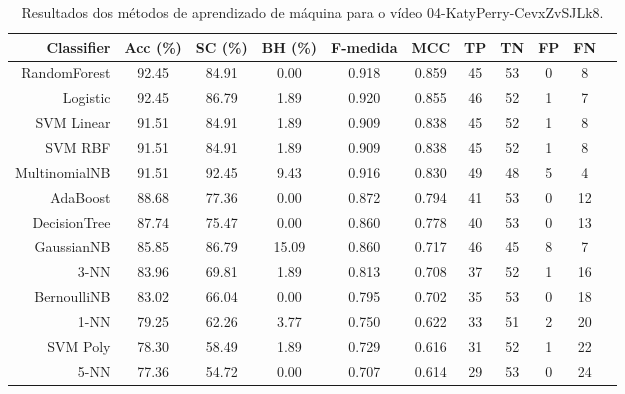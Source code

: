 \begin{table}[!htb]
\centering
\caption{Resultados dos métodos de aprendizado de máquina para o vídeo 04-KatyPerry-CevxZvSJLk8.}
\label{tab:04-KatyPerry-CevxZvSJLk8}
\begin{tabular}{r|c|c|c|c|c|c|c|c|c|c}
\hline\hline
Classifier & Acc (\%) & SC (\%) & BH (\%) & F-medida & MCC & TP & TN & FP & FN \\ \hline
RandomForest & 92.45 & 84.91 & 0.00 & 0.918 & 0.859 & 45 & 53 & 0 & 8 \\ 
Logistic & 92.45 & 86.79 & 1.89 & 0.920 & 0.855 & 46 & 52 & 1 & 7 \\ 
SVM Linear & 91.51 & 84.91 & 1.89 & 0.909 & 0.838 & 45 & 52 & 1 & 8 \\ 
SVM RBF & 91.51 & 84.91 & 1.89 & 0.909 & 0.838 & 45 & 52 & 1 & 8 \\ 
MultinomialNB & 91.51 & 92.45 & 9.43 & 0.916 & 0.830 & 49 & 48 & 5 & 4 \\ 
AdaBoost & 88.68 & 77.36 & 0.00 & 0.872 & 0.794 & 41 & 53 & 0 & 12 \\ 
DecisionTree & 87.74 & 75.47 & 0.00 & 0.860 & 0.778 & 40 & 53 & 0 & 13 \\ 
GaussianNB & 85.85 & 86.79 & 15.09 & 0.860 & 0.717 & 46 & 45 & 8 & 7 \\ 
3-NN & 83.96 & 69.81 & 1.89 & 0.813 & 0.708 & 37 & 52 & 1 & 16 \\ 
BernoulliNB & 83.02 & 66.04 & 0.00 & 0.795 & 0.702 & 35 & 53 & 0 & 18 \\ 
1-NN & 79.25 & 62.26 & 3.77 & 0.750 & 0.622 & 33 & 51 & 2 & 20 \\ 
SVM Poly & 78.30 & 58.49 & 1.89 & 0.729 & 0.616 & 31 & 52 & 1 & 22 \\ 
5-NN & 77.36 & 54.72 & 0.00 & 0.707 & 0.614 & 29 & 53 & 0 & 24 \\ 
\hline\hline
\end{tabular}
\end{table}
